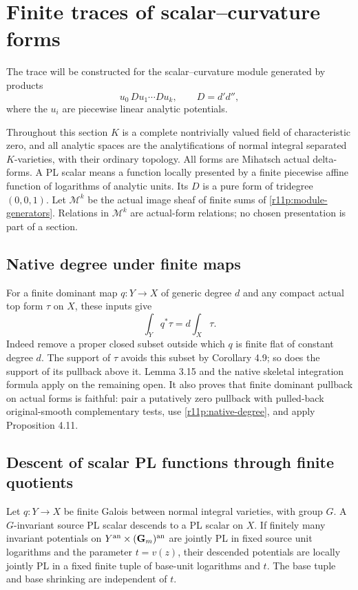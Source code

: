 \section{Finite traces of scalar--curvature forms}
\label{r11p:minimal-trace}

The trace will be constructed for the scalar--curvature module generated by products
\[
  u_0\,Du_1\cdots Du_k,\qquad D=d'd'',
\tag{MT1}\label{r11p:module-generators}
\]
where the $u_i$ are piecewise linear analytic potentials.

Throughout this section $K$ is a complete nontrivially valued field of
characteristic zero, and all analytic spaces are the analytifications of
normal integral separated $K$-varieties, with their ordinary topology.
All forms are Mihatsch actual delta-forms.  A PL scalar means a function
locally presented by a finite piecewise affine function of logarithms of
analytic units.  Its $D$ is a pure form of tridegree $(0,0,1)$.
Let $\mathscr M^k$ be the actual image sheaf of finite sums of
\eqref{r11p:module-generators}.  Relations in $\mathscr M^k$ are actual-form
relations; no chosen presentation is part of a section.

\subsection{Native degree under finite maps}

For a finite dominant map $q:Y\to X$ of generic degree $d$ and any compact
actual top form $\tau$ on $X$, these inputs give
\[
                            \int_Yq^*\tau=d\int_X\tau.
\tag{MT2}\label{r11p:native-degree}
\]
Indeed remove a proper closed subset outside which $q$ is finite flat of
constant degree $d$.  The support of $\tau$ avoids this subset by
Corollary 4.9; so does the support of its pullback above it.
Lemma 3.15 and the native skeletal integration formula apply on the
remaining open.    It also proves that finite dominant pullback on
actual forms is faithful: pair a putatively zero pullback with pulled-back
original-smooth complementary tests, use \eqref{r11p:native-degree}, and
apply Proposition 4.11.

\subsection{Descent of scalar PL functions through finite quotients}

\begin{lemma}
\label{r11p:pl-descent}
Let $q:Y\to X$ be finite Galois between normal integral varieties, with
group $G$.  A $G$-invariant source PL scalar descends to a PL scalar on
$X$.  If finitely many invariant potentials on
$Y^{\rm an}\times(\mathbf G_m)^{\rm an}$ are jointly PL in fixed source
unit logarithms and the parameter $t=v(z)$, their descended potentials
are locally jointly PL in a fixed finite tuple of base-unit logarithms
and $t$.  The base tuple and base shrinking are independent of $t$.
\end{lemma}

